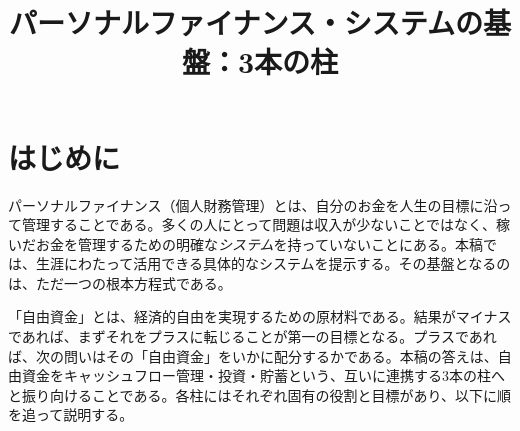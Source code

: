 \documentclass[11pt,a4paper,twocolumn]{article}
\title{\vspace{-1.5em}\bfseries\color{accent}\Large パーソナルファイナンス・システムの基盤：3本の柱}
\author{}
\date{}
\begin{document}

\section{はじめに}
パーソナルファイナンス（個人財務管理）とは、自分のお金を人生の目標に沿って管理することである。多くの人にとって問題は収入が少ないことではなく、稼いだお金を管理するための明確な\textit{システム}を持っていないことにある。本稿では、生涯にわたって活用できる具体的なシステムを提示する。その基盤となるのは、ただ一つの根本方程式である。

\begin{center}
{\setlength{\fboxsep}{10pt}}
\end{center}

「自由資金」とは、経済的自由を実現するための原材料である。結果がマイナスであれば、まずそれをプラスに転じることが第一の目標となる。プラスであれば、次の問いはその「自由資金」をいかに配分するかである。本稿の答えは、自由資金をキャッシュフロー管理・投資・貯蓄という、互いに連携する3本の柱へと振り向けることである。各柱にはそれぞれ固有の役割と目標があり、以下に順を追って説明する。
\end{document}
